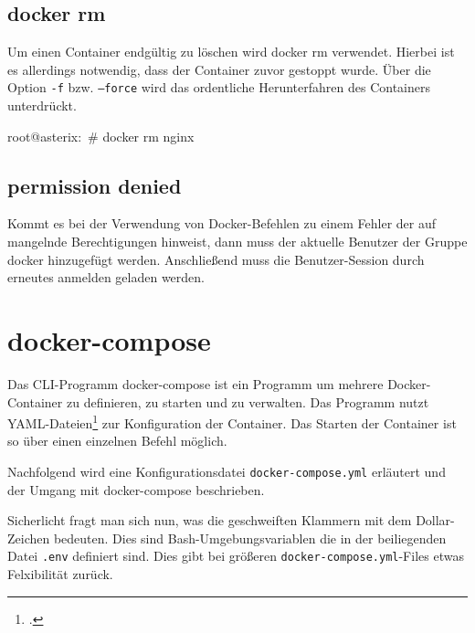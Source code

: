 \subsection{docker rm}%
\label{sec:docker-befehle.rm}
Um einen Container endgültig zu löschen wird docker rm verwendet. Hierbei ist es allerdings notwendig, dass der Container zuvor gestoppt wurde. Über die Option \texttt{-f} bzw. \texttt{--force} wird das ordentliche Herunterfahren des Containers unterdrückt.

\begin{bashcode}
  root@asterix:~# docker rm nginx
\end{bashcode}

\subsection{permission denied}%
\label{sec:docker-befehle.permission_denied}
Kommt es bei der Verwendung von Docker-Befehlen zu einem Fehler der auf mangelnde Berechtigungen hinweist, dann muss der aktuelle Benutzer der Gruppe docker hinzugefügt werden. Anschließend muss die Benutzer-Session durch erneutes anmelden geladen werden.


\section{docker-compose}%
\label{sec:docker-compose}
Das CLI-Programm docker-compose ist ein Programm um mehrere Docker-Container zu definieren, zu starten und zu verwalten. Das Programm nutzt YAML-Dateien\footcite{yaml} zur Konfiguration der Container. Das Starten der Container ist so über einen einzelnen Befehl möglich.

Nachfolgend wird eine Konfigurationsdatei \texttt{docker-compose.yml} erläutert und der Umgang mit docker-compose beschrieben.

\begin{landscape}
\end{landscape}

Sicherlicht fragt man sich nun, was die geschweiften Klammern mit dem Dollar-Zeichen bedeuten. Dies sind Bash-Umgebungsvariablen die in der beiliegenden Datei \texttt{.env} definiert sind. Dies gibt bei größeren \texttt{docker-compose.yml}-Files etwas Felxibilität zurück.

